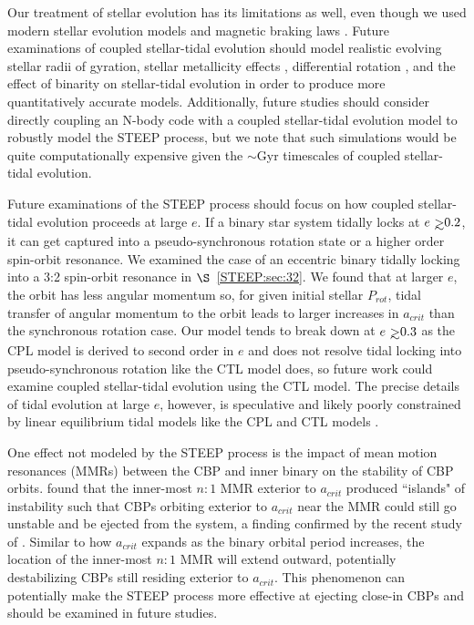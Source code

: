 Our treatment of stellar evolution has its limitations as well, even though we used modern stellar evolution models \citep{Baraffe2015} and magnetic braking laws \citep{Reiners2012,Repetto2014}.  Future examinations of coupled stellar-tidal evolution should model realistic evolving stellar radii of gyration, stellar metallicity effects \citep[e.g.][]{Bolmont2017}, differential rotation \citep[e.g.][]{Lanza2016}, and the effect of binarity on stellar-tidal evolution in order to produce more quantitatively accurate models.  Additionally, future studies should consider directly coupling an N-body code with a coupled stellar-tidal evolution model to robustly model the STEEP process, but we note that such simulations would be quite computationally expensive given the ${\sim}$Gyr timescales of coupled stellar-tidal evolution.

Future examinations of the STEEP process should focus on how coupled stellar-tidal evolution proceeds at large $e$.  If a binary star system tidally locks at $e \gsim 0.2$, it can get captured into a pseudo-synchronous rotation state or a higher order spin-orbit resonance.  We examined the case of an eccentric binary tidally locking into a 3:2 spin-orbit resonance in $\S$~\ref{STEEP:sec:32}.  We found that at larger $e$, the orbit has less angular momentum so, for given initial stellar $P_{rot}$, tidal transfer of angular momentum to the orbit leads to larger increases in $a_{crit}$ than the synchronous rotation case.  Our model tends to break down at $e \gsim 0.3$ as the CPL model is derived to second order in $e$ and does not resolve tidal locking into pseudo-synchronous rotation like the CTL model does, so future work could examine coupled stellar-tidal evolution using the CTL model.  The precise details of tidal evolution at large $e$, however, is speculative and likely poorly constrained by linear equilibrium tidal models like the CPL and CTL models \citep[e.g.][]{FerrazMello2008,Greenberg2009}.

One effect not modeled by the STEEP process is the impact of mean motion resonances (MMRs) between the CBP and inner binary on the stability of CBP orbits.  \citet{Holman1999} found that the inner-most $n:1$ MMR exterior to $a_{crit}$ produced ``islands" of instability such that CBPs orbiting exterior to $a_{crit}$ near the MMR could still go unstable and be ejected from the system, a finding confirmed by the recent study of \citet{Lam2018}.  Similar to how $a_{crit}$ expands as the binary orbital period increases, the location of the inner-most $n:1$ MMR will extend outward, potentially destabilizing CBPs still residing exterior to $a_{crit}$.  This phenomenon can potentially make the STEEP process more effective at ejecting close-in CBPs and should be examined in future studies.

